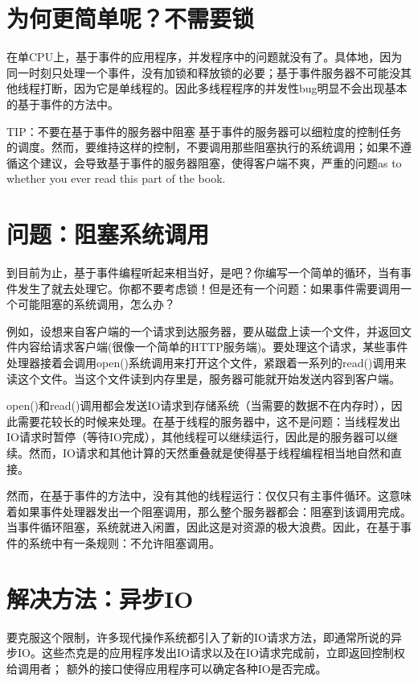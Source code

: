 \section{为何更简单呢？不需要锁}

在单CPU上，基于事件的应用程序，并发程序中的问题就没有了。具体地，因为同一时刻只处理一个事件，没有加锁和释放锁的必要；基于事件服务器不可能没其他线程打断，因为它是单线程的。因此多线程程序的并发性bug明显不会出现基本的基于事件的方法中。

TIP：不要在基于事件的服务器中阻塞
基于事件的服务器可以细粒度的控制任务的调度。然而，要维持这样的控制，不要调用那些阻塞执行的系统调用；如果不遵循这个建议，会导致基于事件的服务器阻塞，使得客户端不爽，严重的问题as to whether you ever read this part of the book.

\section{问题：阻塞系统调用}

到目前为止，基于事件编程听起来相当好，是吧？你编写一个简单的循环，当有事件发生了就去处理它。你都不要考虑锁！但是还有一个问题：如果事件需要调用一个可能阻塞的系统调用，怎么办？

例如，设想来自客户端的一个请求到达服务器，要从磁盘上读一个文件，并返回文件内容给请求客户端(很像一个简单的HTTP服务端)。要处理这个请求，某些事件处理器接着会调用open()系统调用来打开这个文件，紧跟着一系列的read()调用来读这个文件。当这个文件读到内存里是，服务器可能就开始发送内容到客户端。

open()和read()调用都会发送IO请求到存储系统（当需要的数据不在内存时），因此需要花较长的时候来处理。在基于线程的服务器中，这不是问题：当线程发出IO请求时暂停（等待IO完成），其他线程可以继续运行，因此是的服务器可以继续。然而，IO请求和其他计算的天然重叠就是使得基于线程编程相当地自然和直接。

然而，在基于事件的方法中，没有其他的线程运行：仅仅只有主事件循环。这意味着如果事件处理器发出一个阻塞调用，那么整个服务器都会：阻塞到该调用完成。当事件循环阻塞，系统就进入闲置，因此这是对资源的极大浪费。因此，在基于事件的系统中有一条规则：不允许阻塞调用。

\section{解决方法：异步IO}

要克服这个限制，许多现代操作系统都引入了新的IO请求方法，即通常所说的异步IO。这些杰克是的应用程序发出IO请求以及在IO请求完成前，立即返回控制权给调用者；
额外的接口使得应用程序可以确定各种IO是否完成。

